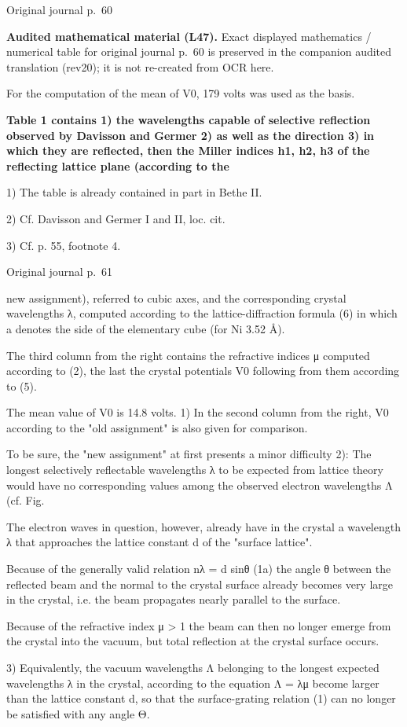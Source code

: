 \documentclass[10pt]{article}
\newcommand{\origpage}[1]{\par\medskip\noindent\hfill{\small\color{notegray}Original journal p.~#1}\hfill\mbox{}\par\smallskip}
\newcommand{\mathref}[2]{\par\smallskip\noindent\colorbox{gray!8}{\parbox{0.95\linewidth}{\small\color{notegray}\textbf{Audited mathematical material (L#1).} Exact displayed mathematics / numerical table for original journal p.~#2 is preserved in the companion audited translation (rev20); it is not re-created from OCR here.}}\par\smallskip}
\begin{document}
\origpage{60}
\mathref{47}{60}
For the computation of the mean of V0, 179 volts was used as the basis.\par
\noindent\textbf{Table 1 contains 1) the wavelengths capable of selective reflection observed by Davisson and Germer 2) as well as the direction 3) in which they are reflected, then the Miller indices h1, h2, h3 of the reflecting lattice plane (according to the}\par
\noindent\footnotesize 1) The table is already contained in part in Bethe II.\par\normalsize
\noindent\footnotesize 2) Cf. Davisson and Germer I and II, loc. cit.\par\normalsize
\noindent\footnotesize 3) Cf. p. 55, footnote 4.\par\normalsize
\origpage{61}
new assignment), referred to cubic axes, and the corresponding crystal wavelengths λ, computed according to the lattice-diffraction formula (6) in which a denotes the side of the elementary cube (for Ni 3.52 Å).\par
The third column from the right contains the refractive indices μ computed according to (2), the last the crystal potentials V0 following from them according to (5).\par
The mean value of V0 is 14.8 volts. 1) In the second column from the right, V0 according to the "old assignment" is also given for comparison.\par
To be sure, the "new assignment" at first presents a minor difficulty 2): The longest selectively reflectable wavelengths λ to be expected from lattice theory would have no corresponding values among the observed electron wavelengths Λ (cf. Fig.\par
The electron waves in question, however, already have in the crystal a wavelength λ that approaches the lattice constant d of the "surface lattice".\par
Because of the generally valid relation nλ = d sinθ (1a) the angle θ between the reflected beam and the normal to the crystal surface already becomes very large in the crystal, i.e. the beam propagates nearly parallel to the surface.\par
Because of the refractive index μ > 1 the beam can then no longer emerge from the crystal into the vacuum, but total reflection at the crystal surface occurs.\par
\noindent\footnotesize 3) Equivalently, the vacuum wavelengths Λ belonging to the longest expected wavelengths λ in the crystal, according to the equation Λ = λμ become larger than the lattice constant d, so that the surface-grating relation (1) can no longer be satisfied with any angle Θ.\par\normalsize
\end{document}
